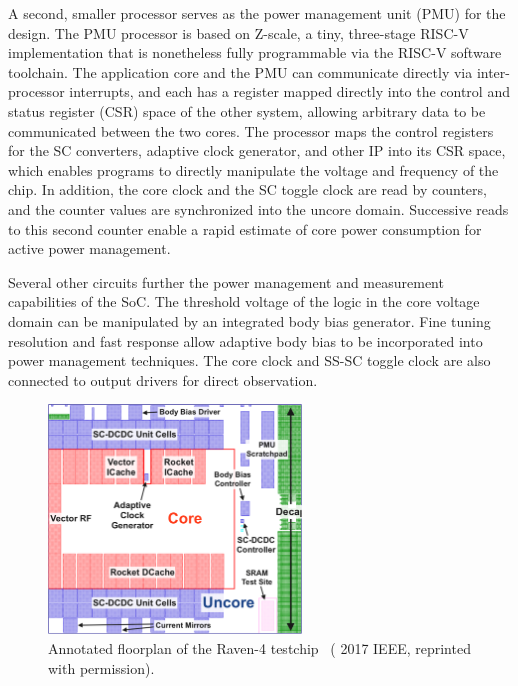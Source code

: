 \documentclass[graybox]{svmult}
\begin{document}
A second, smaller processor serves as the power management unit (PMU) for the design.
The PMU processor is based on Z-scale, a tiny, three-stage RISC-V implementation that is nonetheless fully programmable via the RISC-V software toolchain.
The application core and the PMU can communicate directly via inter-processor interrupts, and each has a register mapped directly into the control and status register (CSR) space of the other system, allowing arbitrary data to be communicated between the two cores.
The processor maps the control registers for the SC converters, adaptive clock generator, and other IP into its CSR space, which enables programs to directly manipulate the voltage and frequency of the chip.
In addition, the core clock and the SC toggle clock are read by counters, and the counter values are synchronized into the uncore domain.
Successive reads to this second counter enable a rapid estimate of core power consumption for active power management.

Several other circuits further the power management and measurement capabilities of the SoC.
The threshold voltage of the logic in the core voltage domain can be manipulated by an integrated body bias generator.
Fine tuning resolution and fast response allow adaptive body bias to be incorporated into power management techniques.
The core clock and SS-SC toggle clock are also connected to output drivers for direct observation.

\begin{figure}
  \centering
  \includegraphics[width=0.6\textwidth]{6-raven4-floorplan}
  \caption{Annotated floorplan of the Raven-4 testchip~\cite{Keller2017} ({\textcopyright} 2017 IEEE, reprinted with permission).}
  \label{fig:6-raven4-floorplan}
\end{figure}
\end{document}
